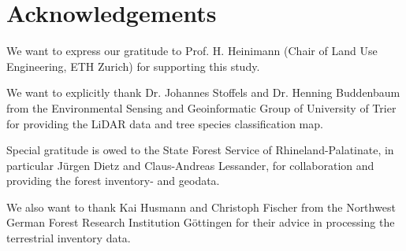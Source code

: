 
\section*{Acknowledgements}
\thispagestyle{plain}

We want to express our gratitude to Prof. H. Heinimann (Chair of Land Use Engineering, ETH Zurich) for supporting this study.

We want to explicitly thank Dr. Johannes Stoffels and Dr. Henning Buddenbaum from the Environmental Sensing and Geoinformatic Group of University of Trier for providing the LiDAR data and tree species classification map.

Special gratitude is owed to the State Forest Service of Rhineland-Palatinate, in particular Jürgen Dietz and Claus-Andreas Lessander, for collaboration and providing the forest inventory- and geodata.

We also want to thank Kai Husmann and Christoph Fischer from the Northwest German Forest Research Institution Göttingen for their advice in processing the terrestrial inventory data.













